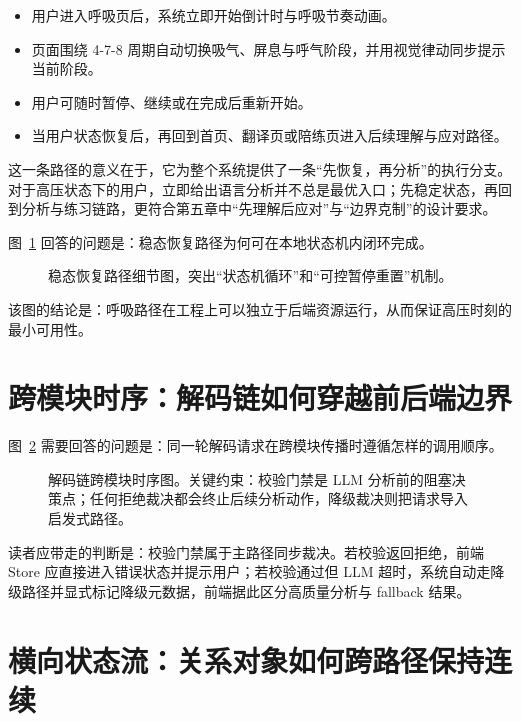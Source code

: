 \begin{itemize}
  \item 用户进入呼吸页后，系统立即开始倒计时与呼吸节奏动画。
  \item 页面围绕 4-7-8 周期自动切换吸气、屏息与呼气阶段，并用视觉律动同步提示当前阶段。
  \item 用户可随时暂停、继续或在完成后重新开始。
  \item 当用户状态恢复后，再回到首页、翻译页或陪练页进入后续理解与应对路径。
\end{itemize}

这一条路径的意义在于，它为整个系统提供了一条“先恢复，再分析”的执行分支。对于高压状态下的用户，立即给出语言分析并不总是最优入口；先稳定状态，再回到分析与练习链路，更符合第五章中“先理解后应对”与“边界克制”的设计要求。

图~\ref{fig:pebble-breathing-path-detail} 回答的问题是：稳态恢复路径为何可在本地状态机内闭环完成。

\begin{figure}[H]
  \centering
  
  \caption{稳态恢复路径细节图，突出“状态机循环”和“可控暂停重置”机制。}
  \label{fig:pebble-breathing-path-detail}
\end{figure}

该图的结论是：呼吸路径在工程上可以独立于后端资源运行，从而保证高压时刻的最小可用性。

\section{跨模块时序：解码链如何穿越前后端边界}

图~\ref{fig:pebble-workflow-cross-sequence} 需要回答的问题是：同一轮解码请求在跨模块传播时遵循怎样的调用顺序。

\begin{figure}[H]
  \centering
  
  \caption{解码链跨模块时序图。关键约束：校验门禁是 LLM 分析前的阻塞决策点；任何拒绝裁决都会终止后续分析动作，降级裁决则把请求导入启发式路径。}
  \label{fig:pebble-workflow-cross-sequence}
\end{figure}

读者应带走的判断是：校验门禁属于主路径同步裁决。若校验返回拒绝，前端 Store 应直接进入错误状态并提示用户；若校验通过但 LLM 超时，系统自动走降级路径并显式标记降级元数据，前端据此区分高质量分析与 fallback 结果。

\section{横向状态流：关系对象如何跨路径保持连续}

